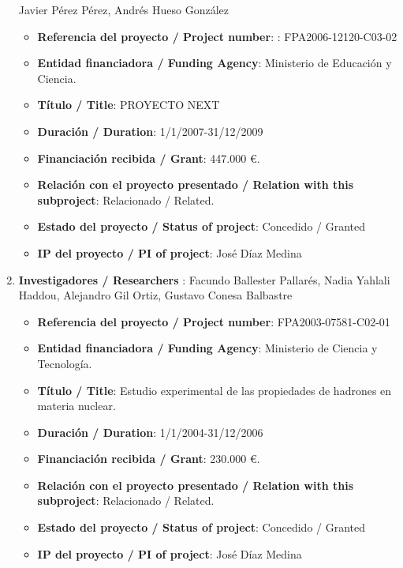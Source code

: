 \begin{enumerate}
Javier Pérez Pérez, Andrés Hueso González
\begin{itemize}
\item {\bf Referencia del proyecto / Project number}: : FPA2006-12120-C03-02
\item {\bf Entidad financiadora / Funding Agency}: Ministerio de Educación y Ciencia.
\item {\bf Título / Title}:  PROYECTO NEXT
\item {\bf Duración / Duration}: 1/1/2007-31/12/2009
\item {\bf Financiación recibida / Grant}:  447.000 \euro. 
\item {\bf Relación con el proyecto presentado / Relation with this subproject}:  Relacionado / Related. 
\item {\bf Estado del proyecto / Status of project}: Concedido / Granted
\item {\bf IP del proyecto / PI of project}: José Díaz Medina
\end{itemize}
\item {\bf Investigadores / Researchers }: Facundo Ballester Pallarés, Nadia Yahlali Haddou, Alejandro Gil Ortiz, Gustavo Conesa Balbastre
\begin{itemize}
\item {\bf Referencia del proyecto / Project number}: FPA2003-07581-C02-01
\item {\bf Entidad financiadora / Funding Agency}: Ministerio de Ciencia y Tecnología.
\item {\bf Título / Title}: Estudio experimental de las propiedades de hadrones en materia nuclear.
\item {\bf Duración / Duration}: 1/1/2004-31/12/2006
\item {\bf Financiación recibida / Grant}:  230.000  \euro. 
\item {\bf Relación con el proyecto presentado / Relation with this subproject}: Relacionado / Related. 
\item {\bf Estado del proyecto / Status of project}: Concedido / Granted
\item {\bf IP del proyecto / PI of project}: José Díaz Medina
\end{itemize}
\end{enumerate}